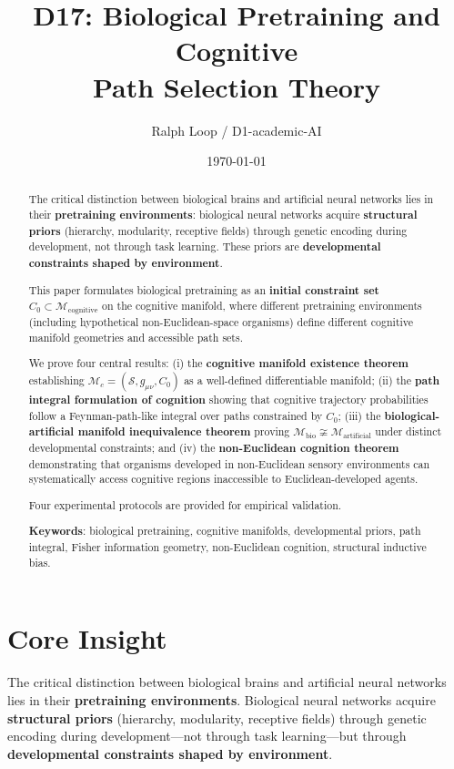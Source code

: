 \documentclass[12pt, a4paper]{article}
\title{\textbf{D17: Biological Pretraining and Cognitive\\Path Selection Theory}}
\author{Ralph Loop / D1-academic-AI}
\date{\today}
\begin{document}
\maketitle

\begin{abstract}
The critical distinction between biological brains and artificial neural networks lies in their \textbf{pretraining environments}: biological neural networks acquire \textbf{structural priors} (hierarchy, modularity, receptive fields) through genetic encoding during development, not through task learning. These priors are \textbf{developmental constraints shaped by environment}.

This paper formulates biological pretraining as an \textbf{initial constraint set} $C_0 \subset \mathcal{M}_{\mathrm{cognitive}}$ on the cognitive manifold, where different pretraining environments (including hypothetical non-Euclidean-space organisms) define different cognitive manifold geometries and accessible path sets.

We prove four central results: (i) the \textbf{cognitive manifold existence theorem} establishing $\mathcal{M}_c = (\mathcal{S}, g_{\mu\nu}, C_0)$ as a well-defined differentiable manifold; (ii) the \textbf{path integral formulation of cognition} showing that cognitive trajectory probabilities follow a Feynman-path-like integral over paths constrained by $C_0$; (iii) the \textbf{biological-artificial manifold inequivalence theorem} proving $\mathcal{M}_{\mathrm{bio}} \not\cong \mathcal{M}_{\mathrm{artificial}}$ under distinct developmental constraints; and (iv) the \textbf{non-Euclidean cognition theorem} demonstrating that organisms developed in non-Euclidean sensory environments can systematically access cognitive regions inaccessible to Euclidean-developed agents.

Four experimental protocols are provided for empirical validation.

\textbf{Keywords}: biological pretraining, cognitive manifolds, developmental priors, path integral, Fisher information geometry, non-Euclidean cognition, structural inductive bias.
\end{abstract}

\tableofcontents
\newpage

\section{Core Insight}\label{sec:core}

The critical distinction between biological brains and artificial neural networks lies in their \textbf{pretraining environments}. Biological neural networks acquire \textbf{structural priors} (hierarchy, modularity, receptive fields) through genetic encoding during development---not through task learning---but through \textbf{developmental constraints shaped by environment}.
\end{document}
